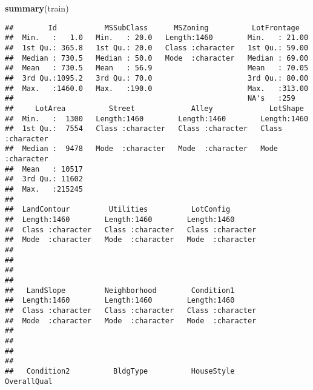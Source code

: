 \documentclass[]{article}
\newenvironment{Shaded}{\begin{snugshade}}{\end{snugshade}}
\newcommand{\KeywordTok}[1]{\textcolor[rgb]{0.13,0.29,0.53}{\textbf{#1}}}
\newcommand{\NormalTok}[1]{#1}
\begin{document}
\begin{Shaded}
\begin{Highlighting}[]
\KeywordTok{summary}\NormalTok{(train)}
\end{Highlighting}
\end{Shaded}

\begin{verbatim}
##        Id           MSSubClass      MSZoning          LotFrontage    
##  Min.   :   1.0   Min.   : 20.0   Length:1460        Min.   : 21.00  
##  1st Qu.: 365.8   1st Qu.: 20.0   Class :character   1st Qu.: 59.00  
##  Median : 730.5   Median : 50.0   Mode  :character   Median : 69.00  
##  Mean   : 730.5   Mean   : 56.9                      Mean   : 70.05  
##  3rd Qu.:1095.2   3rd Qu.: 70.0                      3rd Qu.: 80.00  
##  Max.   :1460.0   Max.   :190.0                      Max.   :313.00  
##                                                      NA's   :259     
##     LotArea          Street             Alley             LotShape        
##  Min.   :  1300   Length:1460        Length:1460        Length:1460       
##  1st Qu.:  7554   Class :character   Class :character   Class :character  
##  Median :  9478   Mode  :character   Mode  :character   Mode  :character  
##  Mean   : 10517                                                           
##  3rd Qu.: 11602                                                           
##  Max.   :215245                                                           
##                                                                           
##  LandContour         Utilities          LotConfig        
##  Length:1460        Length:1460        Length:1460       
##  Class :character   Class :character   Class :character  
##  Mode  :character   Mode  :character   Mode  :character  
##                                                          
##                                                          
##                                                          
##                                                          
##   LandSlope         Neighborhood        Condition1       
##  Length:1460        Length:1460        Length:1460       
##  Class :character   Class :character   Class :character  
##  Mode  :character   Mode  :character   Mode  :character  
##                                                          
##                                                          
##                                                          
##                                                          
##   Condition2          BldgType          HouseStyle         OverallQual    

\end{verbatim}
\end{document}

